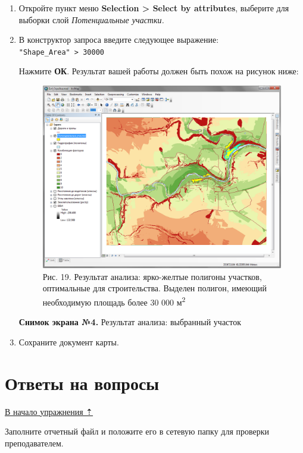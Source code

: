 \documentclass[]{book}
\theoremstyle{definition}
\theoremstyle{definition}
\theoremstyle{definition}
\theoremstyle{remark}
\begin{document}
\begin{enumerate}
\def\labelenumi{\arabic{enumi}.}
\item
  Откройте пункт меню \textbf{Selection \textgreater{} Select by
  attributes}, выберите для выборки слой \emph{Потенциальные участки.}
\item
  В конструктор запроса введите следующее выражение:
  \texttt{"Shape\_Area"\ \textgreater{}\ 30000}

  Нажмите \textbf{ОК}. Результат вашей работы должен быть похож на
  рисунок ниже:

  \begin{figure}
  \centering
  \includegraphics{images/Ex11/image30.png}
  \caption{Рис. 19. Результат анализа: ярко-желтые полигоны участков,
  оптимальные для строительства. Выделен полигон, имеющий необходимую
  площадь более 30 000 м\textsuperscript{2}}
  \end{figure}

  \textbf{Снимок экрана №4.} Результат анализа: выбранный участок
\item
  Сохраните документ карты.
\end{enumerate}

\hypertarget{weighted-overlay-questions}{%
\section{Ответы на вопросы}\label{weighted-overlay-questions}}

\protect\hyperlink{weighted-overlay}{В начало упражнения ⇡}

Заполните отчетный файл и положите его в сетевую папку для проверки
преподавателем.
\end{document}
